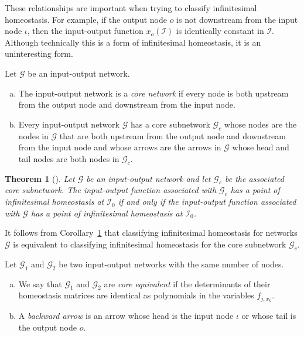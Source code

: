 \documentclass[a4paper,fleqn]{cas-dc}
\newcommand{\II}{{\mathcal I}}
\newtheorem{theorem}{Theorem}[section]
\begin{document}
These relationships are important when trying to classify infinitesimal homeostasis.  For example, if the output node $o$ is not downstream from the input node $\iota$, then the input-output function $x_o(\II)$ is identically constant in $\II$.  Although technically this is a form of infinitesimal homeostasis, it is an uninteresting form.

\begin{definition} \label{D:core} \normalfont
Let $\mathcal{G}$ be an input-output network.
\begin{enumerate}[(a)]
\item The input-output network is a {\em core network} if every node is both upstream from the output node and downstream from the input node.  
\item Every input-output network $\mathcal{G}$ has a core subnetwork $\mathcal{G}_c$ whose nodes are the nodes in $\mathcal{G}$ that are both upstream from the output node and downstream from the input node and whose arrows are the arrows in $\mathcal{G}$ whose head and tail nodes are both nodes in $\mathcal{G}_c$. 
\end{enumerate}
\end{definition}

\begin{theorem}[{\cite[Thm. 2.4]{wang2021}}] \label{T:coreA}
Let $\mathcal{G}$ be an input-output network and let $\mathcal{G}_c$ be the associated core subnetwork. The input-output function associated with $\mathcal{G}_c$ has a point of infinitesimal homeostasis at $\II_0$ if and only if the input-output function associated with $\mathcal{G}$ has a point of infinitesimal homeostasis at $\II_0$.
\end{theorem}

It follows from Corollary~\ref{T:coreA} that classifying infinitesimal homeostasis for networks $\mathcal{G}$ is equivalent to classifying infinitesimal homeostasis for the core subnetwork $\mathcal{G}_c$.

\begin{definition} \label{D:backward} \normalfont
Let $\mathcal{G}_1$ and $\mathcal{G}_2$ be two input-output networks with the same number of nodes.
\begin{enumerate}[(a)]
\item We say that $\mathcal{G}_1$ and $\mathcal{G}_2$ are \emph{core equivalent} if the determinants of their homeostasis matrices are identical as polynomials in the variables $f_{j,x_k}$.
\item A {\em backward arrow} is an arrow whose head is the input node $\iota$ or whose tail is the output node $o$.
\end{enumerate}
\end{definition}
\end{document}
